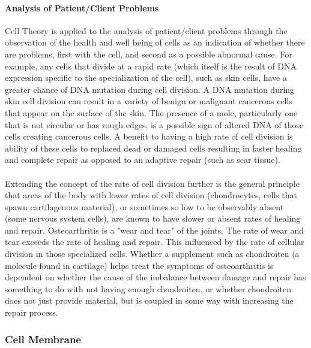 \paragraph{Analysis of Patient/Client Problems}
Cell Theory is applied to the analysis of patient/client problems through the observation of the health and well being of cells as an indication of whether there are problems, first with the cell, and second as a possible abnormal cause. For example, any cells that divide at a rapid rate (which itself is the result of DNA expression specific to the specialization of the cell), such as skin cells, have a greater chance of DNA mutation during cell division. A DNA mutation during skin cell division can result in a variety of benign or malignant cancerous cells that appear on the surface of the skin. The presence of a mole, particularly one that is not circular or has rough edges, is a possible sign of altered DNA of those cells creating cancerous cells. A benefit to having a high rate of cell division is ability of these cells to replaced dead or damaged cells resulting in faster healing and complete repair as opposed to an adaptive repair (such as scar tissue).

\paragraph{}
Extending the concept of the rate of cell division further is the general principle that areas of the body with lower rates of cell division (chondrocytes, cells that spawn cartilagenous material), or sometimes so low to be observably absent (some nervous system cells), are known to have slower or absent rates of healing and repair. Osteoarthritis is a "wear and tear" of the joints. The rate of wear and tear exceeds the rate of healing and repair. This influenced by the rate of cellular division in those specialized cells. Whether a supplement such as chondroiten (a molecule found in cartilage) helps treat the symptoms of osteoarthritis is dependent on whether the cause of the imbalance between damage and repair has something to do with not having enough chondroiten, or whether chondroiten does not just provide material, but is coupled in some way with increasing the repair process.
 
\subsubsection{Cell Membrane}

